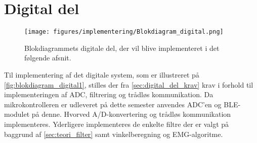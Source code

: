 \section{Digital del}

\begin{figure}[H]
\centering
\texttt{[image: figures/implementering/Blokdiagram\_digital.png]}
\caption{Blokdiagrammets digitale del, der vil blive implementeret i det følgende afsnit.}
\label{fig:blokdiagram_digital1}
\end{figure}

Til implementering af det digitale system, som er illustreret på \autoref{fig:blokdiagram_digital1}, stilles der fra \autoref{sec:digital_del_krav} krav i forhold til implementeringen af ADC, filtrering og trådløs kommunikation. Da mikrokontrolleren er udleveret på dette semester anvendes ADC'en og BLE-modulet på denne. Hvorved A/D-konvertering og trådløs kommunikation implementeres. Yderligere implementeres de enkelte filtre der er valgt på baggrund af \autoref{sec:teori_filter} samt vinkelberegning og EMG-algoritme. 

